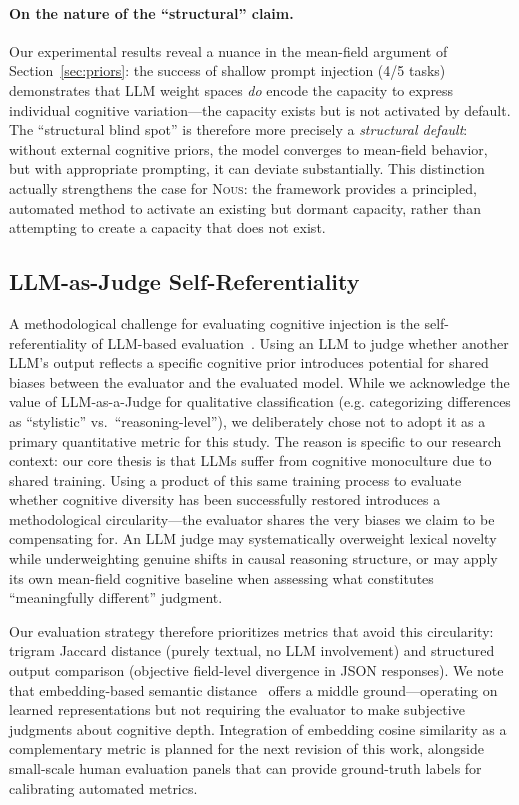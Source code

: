 \documentclass[11pt]{article}
\newcommand{\nous}{\textsc{Nous}}
\newcommand{\eg}{e.g.}
\begin{document}
\paragraph{On the nature of the ``structural'' claim.}
Our experimental results reveal a nuance in the mean-field argument of Section~\ref{sec:priors}: the success of shallow prompt injection (4/5 tasks) demonstrates that LLM weight spaces \emph{do} encode the capacity to express individual cognitive variation---the capacity exists but is not activated by default. The ``structural blind spot'' is therefore more precisely a \emph{structural default}: without external cognitive priors, the model converges to mean-field behavior, but with appropriate prompting, it can deviate substantially. This distinction actually strengthens the case for \nous{}: the framework provides a principled, automated method to activate an existing but dormant capacity, rather than attempting to create a capacity that does not exist.

\subsection{LLM-as-Judge Self-Referentiality}

A methodological challenge for evaluating cognitive injection is the self-referentiality of LLM-based evaluation~\citep{zheng2024judging}. Using an LLM to judge whether another LLM's output reflects a specific cognitive prior introduces potential for shared biases between the evaluator and the evaluated model. While we acknowledge the value of LLM-as-a-Judge for qualitative classification (\eg{} categorizing differences as ``stylistic'' vs.\ ``reasoning-level''), we deliberately chose not to adopt it as a primary quantitative metric for this study. The reason is specific to our research context: our core thesis is that LLMs suffer from cognitive monoculture due to shared training. Using a product of this same training process to evaluate whether cognitive diversity has been successfully restored introduces a methodological circularity---the evaluator shares the very biases we claim to be compensating for. An LLM judge may systematically overweight lexical novelty while underweighting genuine shifts in causal reasoning structure, or may apply its own mean-field cognitive baseline when assessing what constitutes ``meaningfully different'' judgment.

Our evaluation strategy therefore prioritizes metrics that avoid this circularity: trigram Jaccard distance (purely textual, no LLM involvement) and structured output comparison (objective field-level divergence in JSON responses). We note that embedding-based semantic distance~\citep{reimers2019sentence} offers a middle ground---operating on learned representations but not requiring the evaluator to make subjective judgments about cognitive depth. Integration of embedding cosine similarity as a complementary metric is planned for the next revision of this work, alongside small-scale human evaluation panels that can provide ground-truth labels for calibrating automated metrics.
\end{document}
